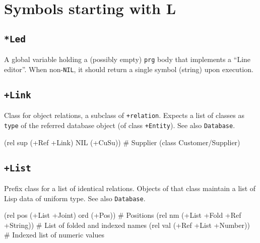 %
%
%

\chapter{Symbols starting with L}
\label{cha:sec:func-ref-L-functions-starting-with-L}
 
\section*{\texttt{*Led}}
\label{sec:func-ref-L-*Led}

A global variable holding a (possibly empty) \texttt{prg} body that implements
a ``Line editor''. When non-\texttt{NIL}, it should return a single symbol
(string) upon execution.



 
\section*{\texttt{+Link}}
\label{sec:func-ref-L-+Link}


Class for object relations, a subclass of \texttt{+relation}. Expects a list of
classes as \texttt{type} of the referred database object (of class \texttt{+Entity}).
See also \texttt{Database}.


\begin{wideverbatim}
(rel sup (+Ref +Link) NIL (+CuSu))  # Supplier (class Customer/Supplier)
\end{wideverbatim}

 
\section*{\texttt{+List}}
\label{sec:func-ref-L-+List}


Prefix class for a list of identical relations. Objects of that class
maintain a list of Lisp data of uniform type. See also \texttt{Database}.


\begin{wideverbatim}
(rel pos (+List +Joint) ord (+Pos))  # Positions
(rel nm (+List +Fold +Ref +String))  # List of folded and indexed names
(rel val (+Ref +List +Number))       # Indexed list of numeric values
\end{wideverbatim}

